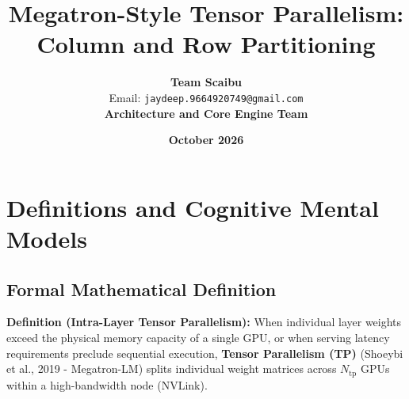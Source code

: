 \documentclass[11pt,a4paper]{article}
\title{\textbf{Megatron-Style Tensor Parallelism: Column and Row Partitioning}}
\author{\textbf{Team Scaibu} \\ \small Email: \texttt{jaydeep.9664920749@gmail.com} \\ \small \textbf{Architecture and Core Engine Team}}
\date{\textbf{October 2026}}
\theoremstyle{definition}
\begin{document}
\maketitle

\section{Definitions and Cognitive Mental Models}

\subsection{Formal Mathematical Definition}
\textbf{Definition (Intra-Layer Tensor Parallelism):}
When individual layer weights exceed the physical memory capacity of a single GPU, or when serving latency requirements preclude sequential execution, \textbf{Tensor Parallelism (TP)} (Shoeybi et al., 2019 - Megatron-LM) splits individual weight matrices across $N_{\text{tp}}$ GPUs within a high-bandwidth node (NVLink).
\end{document}
